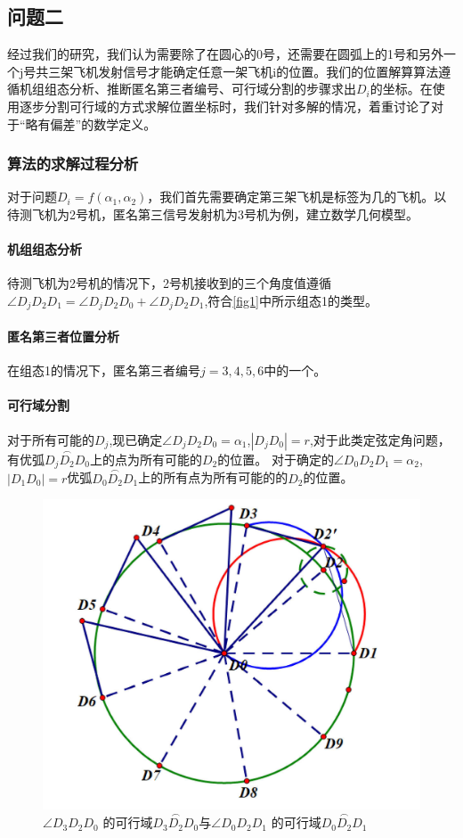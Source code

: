 \documentclass[withoutpreface,bwprint]{cumcmthesis} %
\begin{document}
		\subsection{问题二}
			经过我们的研究，我们认为需要除了在圆心的0号，还需要在圆弧上的1号和另外一个j号共三架飞机发射信号才能确定任意一架飞机i的位置。我们的位置解算算法遵循机组组态分析、推断匿名第三者编号、可行域分割的步骤求出$D_i$的坐标。在使用逐步分割可行域的方式求解位置坐标时，我们针对多解的情况，着重讨论了对于“略有偏差”的数学定义。
			\subsubsection{算法的求解过程分析}
			对于问题$D_i = f(\alpha_1, \alpha_2)$，我们首先需要确定第三架飞机是标签为几的飞机。以待测飞机为2号机，匿名第三信号发射机为3号机为例，建立数学几何模型。
			\paragraph{机组组态分析}
			待测飞机为2号机的情况下，2号机接收到的三个角度值遵循$\angle D_jD_2D_1 =\angle D_jD_2D_0 + \angle D_jD_2D_1$,符合\ref{fig1}中所示组态1的类型。
			\paragraph{匿名第三者位置分析}
			在组态1的情况下，匿名第三者编号$j=3,4,5,6$中的一个。
			\paragraph{可行域分割}
			对于所有可能的$D_j$,现已确定$\angle D_jD_2D_0 = \alpha_1$,$|D_jD_0|= r$,对于此类定弦定角问题，有优弧$\overset{\frown}{D_jD_2D_0}$上的点为所有可能的$D_2$的位置。
			对于确定的$\angle D_0D_2D_1 = \alpha_2$,$|D_1D_0|= r$优弧$\overset{\frown}{D_0D_2D_1}$上的所有点为所有可能的的$D_2$的位置。
			\begin{figure}[htb]
				\centering
				\includegraphics[width=0.5\linewidth]{./figures/3}
				\caption{$\angle D_3D_2D_0$ 的可行域$\overset{\frown}{D_3D_2D_0}$与$\angle D_0D_2D_1$ 的可行域$\overset{\frown}{D_0D_2D_1}$}
				\label{fig3}
			\end{figure}
		
\end{document}
